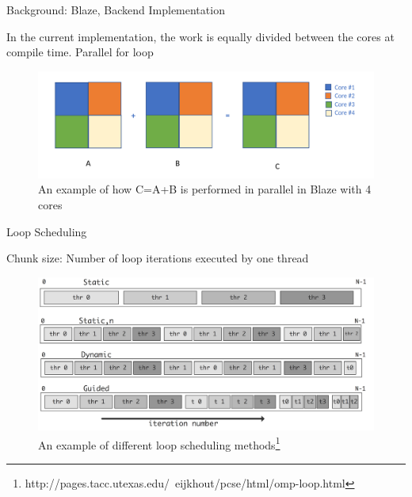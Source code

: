 \documentclass[10pt]{beamer}
\begin{document}
\begin{frame}{Background: Blaze, Backend Implementation}
	\begin{outline}
		In the current implementation, the work is equally divided between the cores at compile time. 
		\1Parallel for loop
		\begin{figure}
			\centering
			\includegraphics[width=0.72\linewidth]{images/old_backend.png}
			\caption{An example of how C=A+B is performed in parallel in Blaze with 4 cores}	
		\end{figure}	

	\end{outline}
\end{frame}

\begin{frame}{Loop Scheduling}
	\begin{outline}
				\1Chunk size: Number of loop iterations executed by one thread 
			\begin{figure}[]
			\centering
			\includegraphics[scale=0.09]{images/schedules.png}
				\caption{An example of different loop scheduling methods\footnote{http://pages.tacc.utexas.edu/~eijkhout/pcse/html/omp-loop.html}}
			\label{fig_loop}
		\end{figure}
	\end{outline}
\end{frame}
\end{document}
